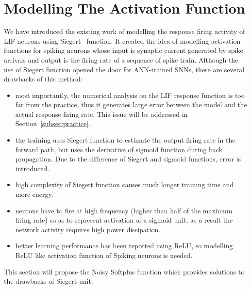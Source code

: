 \section{Modelling The Activation Function}
We have introduced the existing work of modelling the response firing activity of LIF neurons using Siegert~\cite{Jug_etal_2012} function.
It created the idea of modelling activation functions for spiking neurons whose input is synaptic current generated by spike arrivals and output is the firing rate of a sequence of spike train.
Although the use of Siegert function opened the door for ANN-trained SNNs, there are several drawbacks of this method:
\begin{itemize}
	\item most importantly, the numerical analysis on the LIF response function is too far from the practice, thus it generates large error between the model and the actual response firing rate.
	This issue will be addressed in Section~\ref{subsec:practice}.
	\item the training uses Siegert function to estimate the output firing rate in the forward path, but uses the derivative of sigmoid function during back propagation.
	Due to the difference of Siegert and sigmoid functions, error is introduced. 
	\item high complexity of Siegert function causes much longer training time and more energy.
	\item neurons have to fire at high frequency (higher than half of the maximum firing rate) so as to represent activation of a sigmoid unit, as a result the network activity requires high power dissipation.
	\item better learning performance has been reported using ReLU, so modelling ReLU like activation function of Spiking neurons is needed.  
\end{itemize}

This section will propose the Noisy Softplus function which provides solutions to the drawbacks of Siegert unit.
